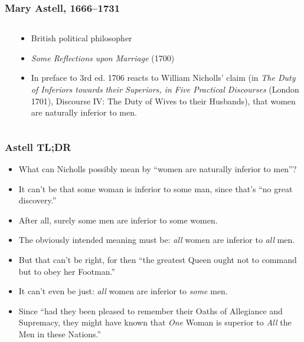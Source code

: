 \begin{frame}
    \frametitle{Mary Astell, 1666--1731}

\begin{columns}
\begin{column}{3cm}
\end{column}
\begin{column}{7cm}
\begin{itemize}
\item British political philosopher
\item \textit{Some Reflections upon Marriage} (1700)
\item In preface to 3rd ed. 1706 reacts to William Nicholls' claim (in \textit{The Duty of Inferiors
towards their Superiors, in Five Practical Discourses} (London 1701), Discourse IV: The Duty of Wives to their
Husbands), that women are naturally inferior to men.
\end{itemize}
\end{column}
\end{columns}
\end{frame}



\begin{frame}
    \frametitle{Astell TL;DR}

\begin{itemize}
  \item What can Nicholls possibly mean by ``women are naturally inferior to men''?
  \item It can't be that some woman is inferior to some man, since
  that's ``no great discovery.''
  \item After all, surely some men are inferior to some women.
  \item The obviously intended meaning must be: \emph{all} women are
  inferior to \emph{all} men.
  \item But that can't be right, for then ``the greatest Queen ought
  not to command but to obey her Footman.''
  \item It can't even be just: \emph{all} women are inferior to
  \emph{some} men.
  \item Since ``had they been pleased to remember their Oaths of
  Allegiance and Supremacy, they might have known that \textit{One}
  Woman is superior to \textit{All} the Men in these Nations.''
\end{itemize}

\end{frame}

